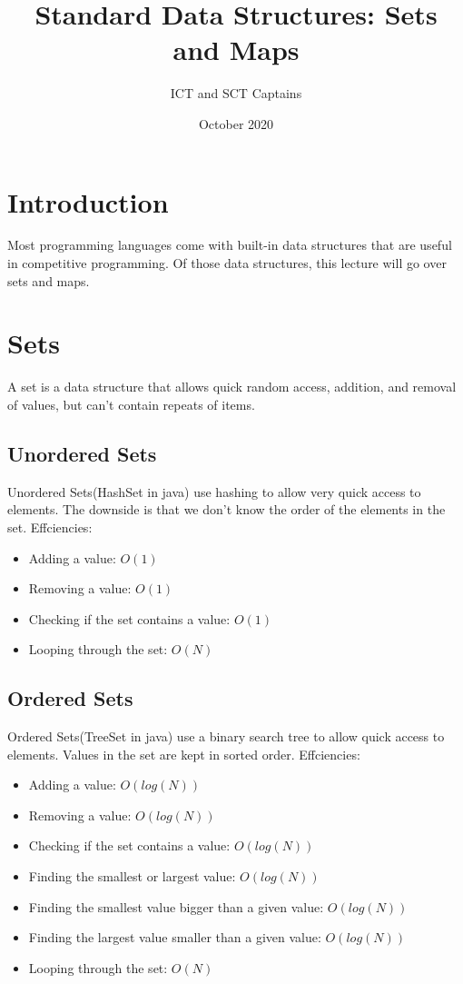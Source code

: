 \documentclass{article}
\title{Standard Data Structures: Sets and Maps}
\author{ICT and SCT Captains}
\date{October 2020}
\begin{document}
\maketitle

\section{Introduction}
    Most programming languages come with built-in data structures that are useful in competitive programming. Of those data structures, this lecture will go over sets and maps. 
    
\section{Sets}
    A set is a data structure that allows quick random access, addition, and removal of values, but can't contain repeats of items.
\subsection{Unordered Sets}
    Unordered Sets(HashSet in java) use hashing to allow very quick access to elements. The downside is that we don't know the order of the elements in the set.
    \newline 
    \newline
    Effciencies: 
    \begin{itemize}
        \item Adding a value: $O(1)$
        \item Removing a value: $O(1)$
        \item Checking if the set contains a value: $O(1)$
        \item Looping through the set: $O(N)$
    \end{itemize}
    
\subsection{Ordered Sets}
    Ordered Sets(TreeSet in java) use a binary search tree to allow quick access to elements. Values in the set are kept in sorted order.
    \newline 
    \newline
    Effciencies: 
    \begin{itemize}
        \item Adding a value: $O(log(N))$
        \item Removing a value: $O(log(N))$
        \item Checking if the set contains a value: $O(log(N))$
        \item Finding the smallest or largest value: $O(log(N))$
        \item Finding the smallest value bigger than a given value: $O(log(N))$
        \item Finding the largest value smaller than a given value: $O(log(N))$
        \item Looping through the set: $O(N)$
    \end{itemize}
\end{document}
